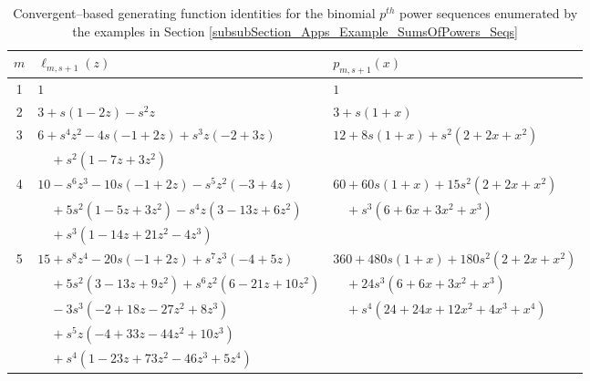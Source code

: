 \documentclass[12pt,reqno]{article}
\numberwithin{sfootnote}{section}
\newcommand{\tabletopstrut}[0]{\rule{0pt}{3ex}}
\numberwithin{equation}{section}
\theoremstyle{plain}
\theoremstyle{definition}
\theoremstyle{remark}
\begin{document}
\begin{table}[h]
\begin{subtable}{\textwidth}
\begin{tabular}{|c|l|l|} \hline 
\hline\tabletopstrut 
$m$ & $\ell_{m,s+1}(z)$ & $p_{m,s+1}(x)$ \\ \hline 
1 & $1$ & $1$ \\ 
2 & $3+s (1-2 z)-s^2 z$ & $3+s (1+x)$ \\ 
3 & $6+s^4 z^2-4 s (-1+2 z)+s^3 z (-2+3 z)$ & 
    $12+8 s (1+x)+s^2 (2+2 x+x^2)$ \\ 
  & $\quad + 
     s^2 (1-7 z+3 z^2)$ & \\ 
4 & $10-s^6 z^3-10 s (-1+2 z)-s^5 z^2 (-3+4 z)$ & 
    $60+60 s (1+x)+15 s^2 (2+2 x+x^2)$ \\ 
  & $\quad + 
     5 s^2 (1-5 z+3 z^2) - 
     s^4 z (3-13 z+6 z^2)$ & 
    $\quad + 
     s^3 (6+6 x+3 x^2+x^3)$ \\ 
  & $\quad  + 
     s^3 (1-14 z+21 z^2-4 z^3)$ & \\ 
5 & $15+s^8 z^4-20 s (-1+2 z)+s^7 z^3 (-4+5 z)$ & 
    $360+480 s (1+x) + 180 s^2 (2+2 x+x^2)$ \\ 
  & $\quad + 
     5 s^2 (3-13 z+9 z^2)+s^6 z^2 (6-21 z+10 z^2)$ & 
    $\quad + 
     24 s^3 (6+6 x+3 x^2+x^3)$ \\ 
  & $\quad - 
     3 s^3 (-2+18 z-27 z^2+8 z^3)$ & 
    $\quad + 
     s^4 (24+24 x+12 x^2+4 x^3+x^4)$ \\ 
  & $\quad + 
     s^5 z (-4+33 z-44 z^2+10 z^3)$ & \\ 
  & $\quad + 
     s^4 (1-23 z+73 z^2-46 z^3+5 z^4)$ & \\ \hline 
\hline 
\end{tabular} 

\end{subtable} 

\caption{Convergent--based generating function identities for the 
         binomial $p^{th}$ power sequences 
         enumerated by the examples in 
         Section \ref{subsubSection_Apps_Example_SumsOfPowers_Seqs}} 
\label{table_ConvGF_Examples_for_PthPowerSeqs} 

\end{table} 

\addtocounter{table}{1}
\setcounter{subtable}{0} 
\end{document}
